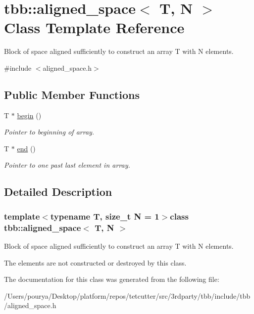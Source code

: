 \hypertarget{classtbb_1_1aligned__space}{}\section{tbb\+:\+:aligned\+\_\+space$<$ T, N $>$ Class Template Reference}
\label{classtbb_1_1aligned__space}


Block of space aligned sufficiently to construct an array T with N elements.  




{\ttfamily \#include $<$aligned\+\_\+space.\+h$>$}

\subsection*{Public Member Functions}
\begin{DoxyCompactItemize}
\item 
\hypertarget{classtbb_1_1aligned__space_a3525dbbac0d4eaedfe18bc57b7760857}{}T $\ast$ \hyperlink{classtbb_1_1aligned__space_a3525dbbac0d4eaedfe18bc57b7760857}{begin} ()\label{classtbb_1_1aligned__space_a3525dbbac0d4eaedfe18bc57b7760857}

\begin{DoxyCompactList}\small\item\em Pointer to beginning of array. \end{DoxyCompactList}\item 
\hypertarget{classtbb_1_1aligned__space_ae95620e1159984a2670bd418ed4748d0}{}T $\ast$ \hyperlink{classtbb_1_1aligned__space_ae95620e1159984a2670bd418ed4748d0}{end} ()\label{classtbb_1_1aligned__space_ae95620e1159984a2670bd418ed4748d0}

\begin{DoxyCompactList}\small\item\em Pointer to one past last element in array. \end{DoxyCompactList}\end{DoxyCompactItemize}


\subsection{Detailed Description}
\subsubsection*{template$<$typename T, size\+\_\+t N = 1$>$class tbb\+::aligned\+\_\+space$<$ T, N $>$}

Block of space aligned sufficiently to construct an array T with N elements. 

The elements are not constructed or destroyed by this class. 

The documentation for this class was generated from the following file\+:\begin{DoxyCompactItemize}
\item 
/\+Users/pourya/\+Desktop/platform/repos/tetcutter/src/3rdparty/tbb/include/tbb/aligned\+\_\+space.\+h\end{DoxyCompactItemize}

